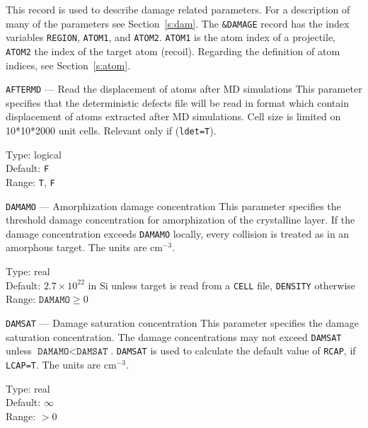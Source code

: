 This record is used to describe damage related parameters. For a description of
many of the parameters see Section~\ref{s:dam}. The \texttt{\&DAMAGE} record has
the index variables \texttt{REGION}, \texttt{ATOM1}, and \texttt{ATOM2}.
\texttt{ATOM1} is the atom index of a projectile, \texttt{ATOM2} the index of the target atom
(recoil). Regarding the definition of atom indices, see Section~\ref{s:atom}.

\ifprivate
\begin{keydescription}{\texttt{AFTERMD} --- Read the displacement of atoms
after MD simulations}
%
  This parameter specifies that the deterministic defects file will be read 
  in format which contain displacement of atoms extracted after MD simulations. 
  Cell size  is limited on 10*10*2000 unit cells. Relevant only if  (\texttt{ldet=T}).
 
 \begin{keytab} 
 Type: \> logical \\ 
 Default: \> \texttt{F} \\ 
 Range: \>  \texttt{T}, \texttt{F}
  \end{keytab}
\end{keydescription}
\fi

\begin{keydescription}{\texttt{DAMAMO} --- Amorphization damage 
    concentration}
%
  This parameter specifies the threshold damage concentration for
  amorphization of the crystalline layer. If the damage concentration
  exceeds \texttt{DAMAMO} locally, every collision is treated as in an
  amorphous target. The units are cm$^{-3}$.
  \begin{keytab}
    Type:    \> real \\
    Default: \> $2.7 \times 10^{22}$ in Si unless target is read from a \texttt{CELL} file, 
                \texttt{DENSITY} otherwise \\
    Range:   \> $\texttt{DAMAMO} \ge 0$
  \end{keytab}
\end{keydescription}

\begin{keydescription}{\texttt{DAMSAT} --- Damage saturation concentration}
%
  This parameter specifies the damage saturation concentration. The damage
  concentrations may not exceed \texttt{DAMSAT} unless 
  $\texttt{DAMAMO} < \texttt{DAMSAT}$. \texttt{DAMSAT} is used to calculate 
  the default value of \texttt{RCAP}, if \texttt{LCAP=T}. The units are 
  cm$^{-3}$.
  \begin{keytab}
    Type:    \> real \\
    Default: \> $\infty$ \\
    Range:   \> $> 0$ 
  \end{keytab}
\end{keydescription}


